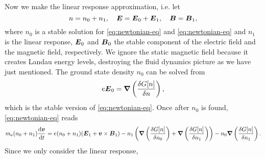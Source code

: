 \documentclass[hyperref, a4paper]{article}
\begin{document}
Now we make the linear response approximation, i.e. let 
\begin{equation}
    n = n_0 + n_1, \quad \vb*{E} = \vb*{E}_0 + \vb*{E}_1, \quad \vb*{B} = \vb*{B}_1,
\end{equation}
where $n_0$ is a stable solution for \eqref{eq:newtonian-eq} and \eqref{eq:newtonian-eq} and $n_1$ is the linear response, $\vb*{E}_0$ and $\vb*{B}_0$ the stable component of the electric field and the magnetic field, respectively.
We ignore the static magnetic field because it creates Landau energy levels, destroying the fluid dynamics picture as we have just mentioned.
The ground state density $n_0$ can be solved from 
\begin{equation}
    e \vb*{E}_0 = \grad\left(\fdv{G[n]}{n}\right),
\end{equation}
which is the stable version of \eqref{eq:newtonian-eq}.
Once after $n_0$ is found, \eqref{eq:newtonian-eq} reads 
\[
    m_\text{e} (n_0 + n_1) \dv{\vb*{v}}{t} = e (n_0 + n_1) (\vb*{E}_1 + \vb*{v} \times \vb*{B}_1) - n_1 \left( \grad \left(\fdv{G[n]}{n_0}\right) + \grad \left(\fdv{G[n]}{n_1}\right) \right) - n_0 \grad \left(\fdv{G[n]}{n_1}\right).
\]
Since we only consider the linear response, 
\end{document}
